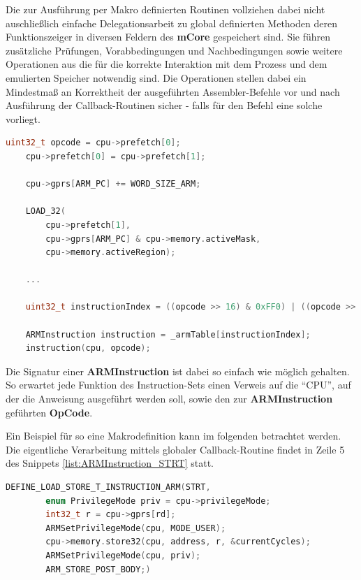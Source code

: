 \documentclass[11pt,a4paper]{scrartcl}
\begin{document}
Die zur Ausf\"uhrung per Makro definierten Routinen vollziehen dabei nicht auschlie{\ss}lich einfache Delegationsarbeit zu global definierten Methoden deren Funktionszeiger in diversen Feldern des \textbf{mCore} gespeichert sind. Sie f\"uhren zus\"atzliche Pr\"ufungen, Vorabbedingungen und Nachbedingungen sowie weitere Operationen aus die f\"ur die korrekte Interaktion mit dem Prozess und dem emulierten Speicher notwendig sind. Die Operationen stellen dabei ein Mindestma{\ss} an Korrektheit der ausgef\"uhrten Assembler-Befehle vor und nach Ausf\"uhrung der Callback-Routinen sicher - falls f\"ur den Befehl eine solche vorliegt.

\vspace{5mm}
\begin{lstlisting}[language=C++, caption={Ausschnitt aus der \textbf{ARMStep}-Methode}, label={list:ARMStep}]
    uint32_t opcode = cpu->prefetch[0];
	cpu->prefetch[0] = cpu->prefetch[1];

	cpu->gprs[ARM_PC] += WORD_SIZE_ARM;
	
	LOAD_32(
	    cpu->prefetch[1],
	    cpu->gprs[ARM_PC] & cpu->memory.activeMask,
	    cpu->memory.activeRegion);

    ...
	
	uint32_t instructionIndex = ((opcode >> 16) & 0xFF0) | ((opcode >> 4) & 0x00F);
	
	ARMInstruction instruction = _armTable[instructionIndex];
	instruction(cpu, opcode);
\end{lstlisting}

Die Signatur einer \textbf{ARMInstruction} ist dabei so einfach wie m\"oglich gehalten. So erwartet jede Funktion des Instruction-Sets einen Verweis auf die \enquote{CPU}, auf der die Anweisung ausgef\"uhrt werden soll, sowie den zur \textbf{ARMInstruction} gef\"uhrten \textbf{OpCode}.

Ein Beispiel f\"ur so eine Makrodefinition kann im folgenden betrachtet werden. Die eigentliche Verarbeitung mittels globaler Callback-Routine findet in Zeile 5 des Snippets \ref{list:ARMInstruction_STRT} statt.

\vspace{5mm}
\begin{lstlisting}[language=C++, caption={ARM Instruction Makro f\"ur \textbf{STRT}}, label={list:ARMInstruction_STRT}]
    DEFINE_LOAD_STORE_T_INSTRUCTION_ARM(STRT,
	    enum PrivilegeMode priv = cpu->privilegeMode;
	    int32_t r = cpu->gprs[rd];
	    ARMSetPrivilegeMode(cpu, MODE_USER);
	    cpu->memory.store32(cpu, address, r, &currentCycles);
	    ARMSetPrivilegeMode(cpu, priv);
	    ARM_STORE_POST_BODY;)
\end{lstlisting}
\end{document}

